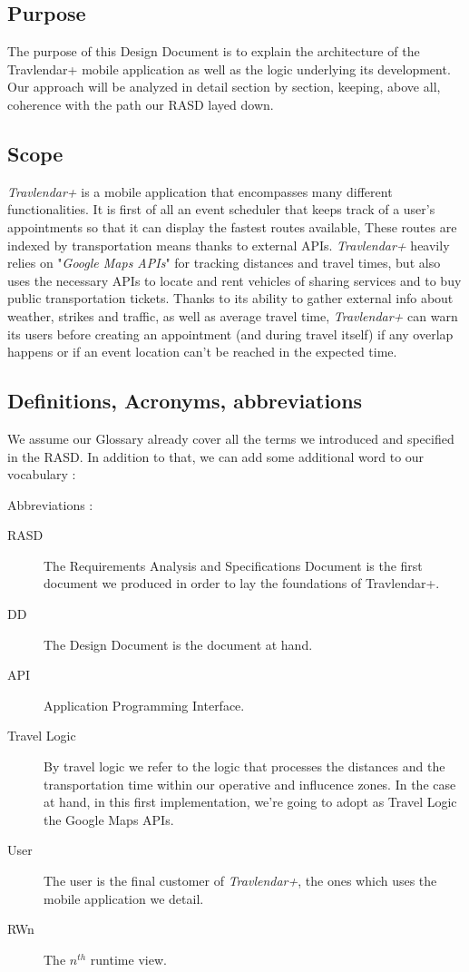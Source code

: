 \subsection{Purpose}
The purpose of this Design Document is to explain the architecture of the Travlendar+ mobile application as well as the logic underlying its development. Our approach will be analyzed in detail section by section, keeping, above all, coherence with the path our RASD layed down.

\subsection{Scope}
\textit{Travlendar+} is a mobile application that encompasses many different functionalities. 
It is first of all an event scheduler that keeps track of a user’s appointments so that it can display the fastest routes available, These routes are indexed by transportation means thanks to external APIs.
\textit{Travlendar+} heavily relies on "\textit{Google Maps APIs}" for tracking distances and travel times, but also uses the necessary APIs to locate and rent vehicles of sharing services and to buy public transportation tickets. Thanks to its ability to gather external info about weather, strikes and traffic, as well as average travel time, \textit{Travlendar+} can warn its users before creating an appointment (and during travel itself) if any overlap happens or if an event location can’t be reached in the expected time.

\subsection{Definitions, Acronyms, abbreviations}
We assume our Glossary already cover all the terms we introduced and specified in the RASD. In addition to that, we can add some additional word to our vocabulary :

Abbreviations :
\begin{description}
	\item[RASD] The Requirements Analysis and Specifications Document is the first document we produced in order to lay the foundations of Travlendar+.
	\item[DD] The Design Document is the document at hand.
	\item[API] Application Programming Interface.
	\item[Travel Logic] By travel logic we refer to the logic that processes the distances and the transportation time within our operative and influcence zones. In the case at hand, in this first implementation, we're going to adopt as Travel Logic the Google Maps APIs.
	\item[User]  The user is the final customer of \textit{Travlendar+}, the ones which uses the mobile application we detail.
	\item [RWn] The $n^{th}$ runtime view.
\end{description}

